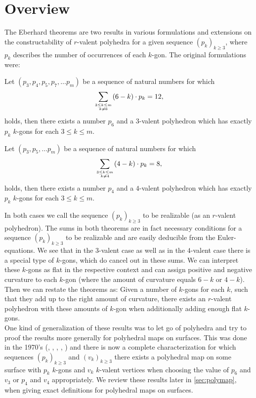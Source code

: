 \section{Overview}

The {\sc Eberhard} theorems are two results in various formulations and extensions on the constructability of $r$-valent polyhedra for a given sequence $(p_k)_{k \geq 3}$, where $p_k$ describes the number of occurrences of each $k$-gon. The original formulations were:
\begin{theorem}\label{thm:eberhard:3} Let $(p_3, p_4, p_5, p_7, \dots p_m)$ be a sequence of natural numbers for which
\begin{align*}
  \sum_{3 \leq k \leq m \atop k \neq 6}(6 - k) \cdot p_k = 12,
\end{align*}
holds, then there exists a number $p_6$ and a $3$-valent polyhedron which has exactly $p_k$ $k$-gons for each $3 \leq k \leq m$.
\end{theorem}
\begin{theorem}\label{thm:eberhard:4} Let $(p_3,  p_5, \dots p_m)$ be a sequence of natural numbers for which
\begin{align*}
  \sum_{3 \leq k \leq m \atop k \neq 4}(4 - k) \cdot p_k = 8,
\end{align*}
holds, then there exists a number $p_4$ and a $4$-valent polyhedron which has exactly $p_k$ $k$-gons for each $3 \leq k \leq m$.
\end{theorem}
In both cases we call the sequence $(p_k)_{k \geq 3}$ to be realizable (as an $r$-valent polyhedron). The sums in both theorems are in fact necessary conditions for a sequence $(p_k)_{k \geq 3}$ to be realizable and are easily deducible from the {\sc Euler}-equations. We see that in the $3$-valent case as well as in the $4$-valent case there is a special type of $k$-gons, which do cancel out in these sums. We can interpret these $k$-gons as flat in the respective context and can assign positive and negative curvature to each $k$-gon (where the amount of curvature equals $6 - k$ or $4 - k$). Then we can restate the theorems as: Given a number of $k$-gons for each $k$, such that they add up to the right amount of curvature, there exists an $r$-valent polyhedron with these amounts of $k$-gon when additionally adding enough flat $k$-gons.\\

One kind of generalization of these results was to let go of polyhedra and try to proof the results more generally for polyhedral maps on surfaces. This was done in the 1970's (\cite{jendrol1977generalization}, \cite{jucovivc1973theorem}, \cite{barnette1971toroidal}, \cite{grunbaum1969planar}, \cite{zaks1971analogue}) and there is now a complete characterization for which sequences $(p_k)_{k\geq 3}$ and $(v_k)_{k \geq 3}$ there exists a polyhedral map on some surface with $p_k$ $k$-gons and $v_k$ $k$-valent vertices when choosing the value of $p_6$ and $v_3$ or $p_4$ and $v_4$ appropriately. We review these results later in \autoref{sec:polymap}, when giving exact definitions for polyhedral maps on surfaces.\\

